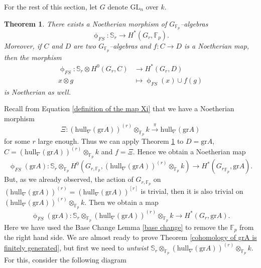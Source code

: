 \documentclass{article}
\theoremstyle{plain}
\newtheorem{Th}{Theorem}[section]
\theoremstyle{definition}
\newcommand{\GL}{\mathrm{GL}}
\begin{document}
For the rest of this section, let $G$ denote $\GL_n$ over $k$. 

\begin{Th}\label{FS full strength}
    There exists a Noetherian morphism of $G_{\mathbb{F}_p}$--algebras 
    \[
    \upphi_{FS}\colon \mathbb{S}_r\to H^\ast(G_r,\mathbb{F}_p).
    \]
    Moreover, if $C$ and $D$ are two $G_{\mathbb{F}_p}$--algebras and $f\colon C\to D$ is a Noetherian map, then the morphism  
\begin{align*}
    \upphi_{FS}\colon \mathbb{S}_r\otimes H^0(G_r,C) & \to H^\ast(G_r,D)\\
    x\otimes g & \mapsto \upphi_{FS}(x)\cup f(g)
\end{align*} is Noetherian as well. 
\end{Th}


Recall from Equation \ref{definition of the map Xi} that we have a Noetherian morphism 
\[
\Xi\colon (\mathrm{hull}_\nabla(\mathrm{gr}A))^{(r)}\otimes_{\mathbb{F}_p}k\xrightarrow[]{\pi} \mathrm{hull}_\nabla(\mathrm{gr}A)
\]
for some $r$ large enough. Thus we can apply Theorem \ref{FS full strength} to $D=\mathrm{gr}A$, $C=(\mathrm{hull}_\nabla(\mathrm{gr}A))^{(r)}\otimes_{\mathbb{F}_p} k$ and $f=\Xi$. Hence we obtain a Noetherian  map 
\[
\upphi_{FS}(\mathrm{gr}A)\colon \mathbb{S}_r\otimes_{\mathbb{F}_p}H^0(G_{r,\mathbb{F}_p}, (\mathrm{hull}_\nabla(\mathrm{gr}A))^{(r)}\otimes_{\mathbb{F}_p}k)\to H^\ast({G_r}_{\mathbb{F}_p},\mathrm{gr}A).
\]
But, as we already observed, the action of $G_{r,\mathbb{F}_p}$ on $(\mathrm{hull}_\nabla(\mathrm{gr}A))^{(r)}=(\mathrm{hull}_\nabla(\mathrm{gr}A))^{[r]}$ is trivial, then it is also trivial on $(\mathrm{hull}_\nabla(\mathrm{gr}A))^{(r)}\otimes_{\mathbb{F}_p} k$. Then we obtain a map 
\[
\upphi_{FS}(\mathrm{gr}A)\colon \mathbb{S}_r\otimes_{\mathbb{F}_p} (\mathrm{hull}_\nabla(\mathrm{gr}A))^{(r)}\otimes_{\mathbb{F}_p}k\to H^\ast({G_r},\mathrm{gr}A).
\]
Here we have used the Base Change Lemma \ref{base change} to remove the $\mathbb{F}_p$ from the right hand side. We are almost ready to prove Theorem \ref{cohomology of grA is finitely generated}, but first we need to \textit{untwist}  $\mathbb{S}_r\otimes_{\mathbb{F}_p} (\mathrm{hull}_\nabla(\mathrm{gr}A))^{(r)}\otimes_{\mathbb{F}_p}k$. For this, consider the following diagram


\begin{center}
    \end{center}
\end{document}
